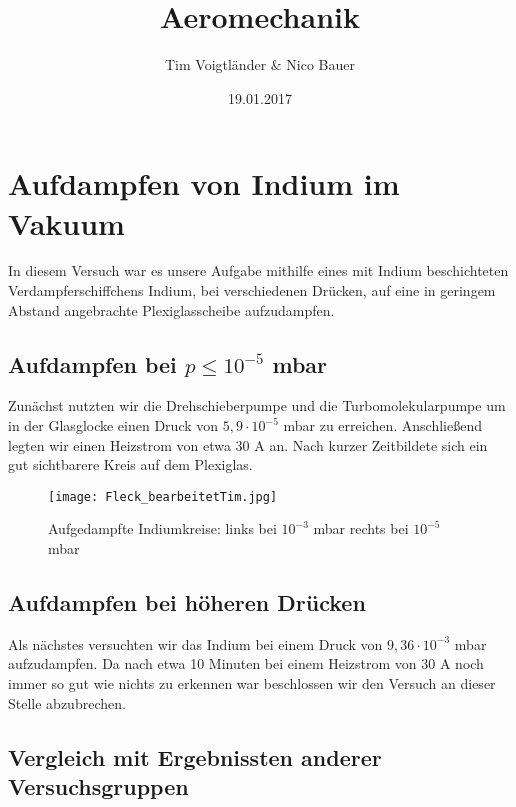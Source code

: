 \documentclass[a4paper,12pt]{scrartcl}
\begin{document}
\author{Tim Voigtländer \& Nico Bauer}
\title{Aeromechanik}
\date{19.01.2017} 

\maketitle
\tableofcontents
{}

\newpage

\section{Aufdampfen von Indium im Vakuum}

In diesem Versuch war es unsere Aufgabe mithilfe eines mit Indium beschichteten Verdampferschiffchens Indium, bei verschiedenen Drücken, auf eine in geringem Abstand angebrachte Plexiglasscheibe aufzudampfen. 

\subsection{Aufdampfen bei $p \leq 10^{-5}$ mbar}

Zunächst nutzten wir die Drehschieberpumpe und die Turbomolekularpumpe um in der Glasglocke einen Druck von $5,9 \cdot 10^{-5}$ mbar zu erreichen.
Anschließend legten wir einen Heizstrom von etwa 30 A an. Nach kurzer Zeitbildete sich ein gut sichtbarere Kreis auf dem Plexiglas.

\begin{figure}
	\label{fleck}
	\centering
	\texttt{[image: Fleck\_bearbeitetTim.jpg]}
	\caption{Aufgedampfte Indiumkreise: links bei $10^{-3}$ mbar rechts bei $10^{-5}$ mbar}
\end{figure}

\subsection{Aufdampfen bei höheren Drücken}

Als nächstes versuchten wir das Indium bei einem Druck von $9,36\cdot 10^{-3}$ mbar aufzudampfen. Da nach etwa 10 Minuten bei einem Heizstrom von 30 A noch immer so gut wie nichts zu erkennen war beschlossen wir den Versuch an dieser Stelle abzubrechen.

\subsection{Vergleich mit Ergebnissten anderer Versuchsgruppen}
\end{document}
